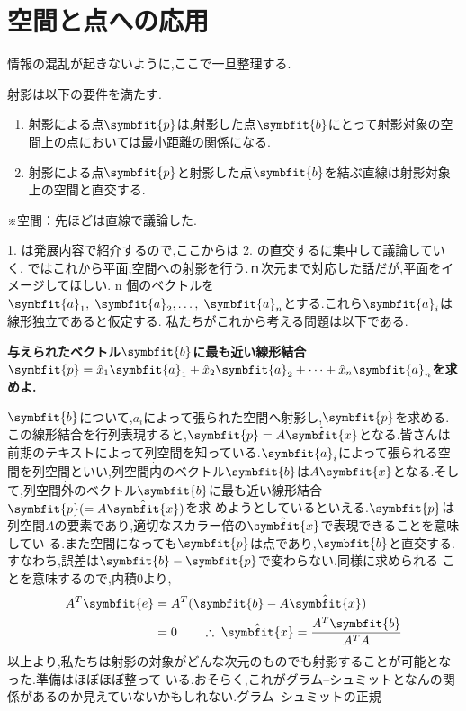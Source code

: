 \section{空間と点への応用}
情報の混乱が起きないように,ここで一旦整理する.
\begin{framed}
射影は以下の要件を満たす.
\begin{enumerate}
    \item 射影による点$\symbfit{p}$は,射影した点$\symbfit{b}$にとって射影対象の空間上の点においては最小距離の関係になる.
    \item 射影による点$\symbfit{p}$と射影した点$\symbfit{b}$を結ぶ直線は射影対象上の空間と直交する.
\end{enumerate}
※空間：先ほどは直線で議論した.
\end{framed}
1. は発展内容で紹介するので,ここからは 2. の直交するに集中して議論していく.
ではこれから平面,空間への射影を行う.ｎ次元まで対応した話だが,平面をイメージしてほしい.
n 個のベクトルを $\symbfit{a}_1,\;\symbfit{a}_2,\dots,\;\symbfit{a}_n$とする.これら$\symbfit{a}_i$は線形独立であると仮定する.
私たちがこれから考える問題は以下である.
\begin{center}
    \textbf{与えられたベクトル$\symbfit{b}$に最も近い線形結合$\symbfit{p}=\hat{x}_1\symbfit{a}_1+\hat{x}_2\symbfit{a}_2+\dots+\hat{x}_n\symbfit{a}_n$を求めよ.}
\end{center}
$\symbfit{b}$について,$a_i$によって張られた空間へ射影し,$\symbfit{p}$を求める.
この線形結合を行列表現すると,$\symbfit{p}=A\hat{\symbfit{x}}$となる.皆さんは前期のテキストによって列空間を知っている.$\symbfit{a}_i$によって張られる空間を列空間といい,列空間$\dot{内}$のベクトル$\symbfit{b}$は$A\symbfit{x}$となる.そして,列空間$\dot{外}$のベクトル$\symbfit{b}$に最も近い線形結合$\symbfit{p}(=A\hat{\symbfit{x}})$を求
めようとしているといえる.$\symbfit{p}$は列空間$A$の要素であり,適切なスカラー倍の$\hat{\symbfit{x}}$で表現できることを意味してい
る.また空間になっても$\symbfit{p}$は点であり,$\symbfit{b}$と直交する.すなわち,誤差は$\symbfit{b}-\symbfit{p}$で変わらない.同様に求められる
ことを意味するので,内積0より,
\begin{align*}\displaystyle
    A^T\symbfit{e} &= A^T(\symbfit{b}-A\hat{\symbfit{x}})\\
                   &= 0 \qquad \therefore\;\hat{\symbfit{x}}=\frac{A^T\symbfit{b}}{A^TA}
\end{align*}
以上より,私たちは射影の対象がどんな次元のものでも射影することが可能となった.準備はほぼほぼ整って
いる.おそらく,これがグラム--シュミットとなんの関係があるのか見えていないかもしれない.グラム--シュミットの正規
